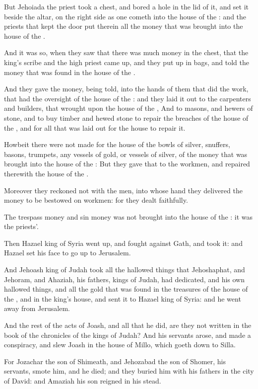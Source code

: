 \Verse But Jehoiada the priest took a chest, and bored a hole in the lid of it, and set it beside the altar, on the right side as one cometh into the house of the \LORD: and the priests that kept the door put therein all the money that was brought into the house of the \LORD.

\Verse And it was so, when they saw that there was much money in the chest, that the king's scribe and the high priest came up, and they put up in bags, and told the money that was found in the house of the \LORD.

\Verse And they gave the money, being told, into the hands of them that did the work, that had the oversight of the house of the \LORD: and they laid it out to the carpenters and builders, that wrought upon the house of the \LORD, \Verse And to masons, and hewers of stone, and to buy timber and hewed stone to repair the breaches of the house of the \LORD, and for all that was laid out for the house to repair it.

\Verse Howbeit there were not made for the house of the \LORD bowls of silver, snuffers, basons, trumpets, any vessels of gold, or vessels of silver, of the money that was brought into the house of the \LORD: \Verse But they gave that to the workmen, and repaired therewith the house of the \LORD.

\Verse Moreover they reckoned not with the men, into whose hand they delivered the money to be bestowed on workmen: for they dealt faithfully.

\Verse The trespass money and sin money was not brought into the house of the \LORD: it was the priests'.

\Verse Then Hazael king of Syria went up, and fought against Gath, and took it: and Hazael set his face to go up to Jerusalem.

\Verse And Jehoash king of Judah took all the hallowed things that Jehoshaphat, and Jehoram, and Ahaziah, his fathers, kings of Judah, had dedicated, and his own hallowed things, and all the gold that was found in the treasures of the house of the \LORD, and in the king's house, and sent it to Hazael king of Syria: and he went away from Jerusalem.

\Verse And the rest of the acts of Joash, and all that he did, are they not written in the book of the chronicles of the kings of Judah?  \Verse And his servants arose, and made a conspiracy, and slew Joash in the house of Millo, which goeth down to Silla.

\Verse For Jozachar the son of Shimeath, and Jehozabad the son of Shomer, his servants, smote him, and he died; and they buried him with his fathers in the city of David: and Amaziah his son reigned in his stead.


